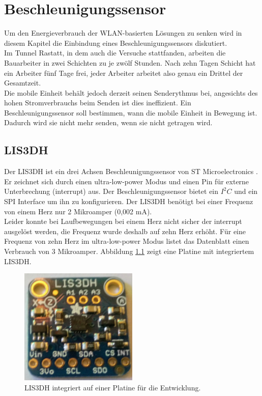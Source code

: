 \chapter{Beschleunigungssensor}
\label{ch:Beschleunigungssensor}
Um den Energieverbrauch der WLAN-basierten Lösungen zu senken wird in diesem Kapitel die Einbindung eines Beschleunigungssensors diskutiert. \\
Im Tunnel Rastatt, in dem auch die Versuche stattfanden, arbeiten die Bauarbeiter in zwei Schichten zu je zwölf Stunden. 
Nach zehn Tagen Schicht hat ein Arbeiter fünf Tage frei, jeder Arbeiter arbeitet also genau ein Drittel der Gesamtzeit. \\
Die mobile Einheit behält jedoch derzeit seinen Senderythmus bei, angesichts des hohen Stromverbrauchs beim Senden ist dies ineffizient.
Ein Beschleunigungssensor soll bestimmen, wann die mobile Einheit in Bewegung ist. 
Dadurch wird sie nicht mehr senden, wenn sie nicht getragen wird.

\section{LIS3DH}
Der LIS3DH ist ein drei Achsen Beschleunigungssensor von ST Microelectronics \cite{st2015lis}.
Er zeichnet sich durch einen ultra-low-power Modus und einen Pin für externe Unterbrechung (interrupt) aus.
Der Beschleunigungssensor bietet ein $I^2C$ und ein SPI Interface um ihn zu konfigurieren.
Der LIS3DH benötigt bei einer Frequenz von einem Herz nur 2 Mikroamper (0,002 mA).\\
Leider konnte bei Laufbewegungen bei einem Herz nicht sicher der interrupt ausgelöst werden, die Frequenz wurde deshalb auf zehn Herz erhöht.
Für eine Frequenz von zehn Herz im ultra-low-power Modus listet das Datenblatt einen Verbrauch von 3 Mikroamper.
Abbildung \ref{fig:lis3dh} zeigt eine Platine mit integriertem LIS3DH.

\begin{figure}[h]
  \centering
	\includegraphics[width=0.5\textwidth]{images/lis3dh.jpg}
  \caption{LIS3DH integriert auf einer Platine für die Entwicklung.}
  \label{fig:lis3dh}
\end{figure}

